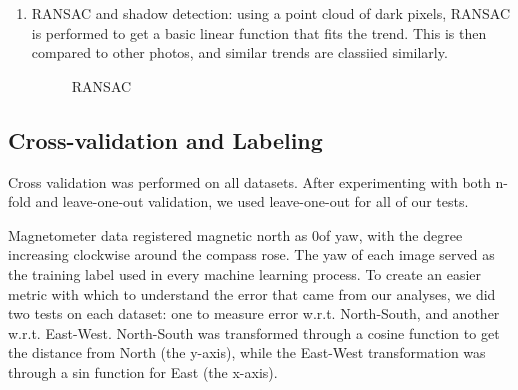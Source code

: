 \documentclass{article}
\begin{document}
\begin{enumerate}[1]
\item RANSAC and shadow detection: using a point cloud of dark pixels, RANSAC is performed to get a basic linear function that fits the trend. This is then compared to other photos, and similar trends are classiied similarly.
\begin{figure}[H]
\centering
\setlength\fboxsep{2pt}
\setlength\fboxrule{0pt}
\caption{
RANSAC
}
\end{figure}

\end{enumerate}


\subsection{Cross-validation and Labeling}
Cross validation was performed on all datasets. After experimenting with both n-fold and leave-one-out validation, we used leave-one-out for all of our tests. 

Magnetometer data registered magnetic north as 0\degrees of yaw, with the degree increasing clockwise around the compass rose. The yaw of each image served as the training label used in every machine learning process. To create an easier metric with which to understand the error that came from our analyses, we did two tests on each dataset: one to measure error w.r.t. North-South, and another w.r.t. East-West. North-South was transformed through a cosine function to get the distance from North (the y-axis), while the East-West transformation was through a sin function for East (the x-axis). 

\end{document}
